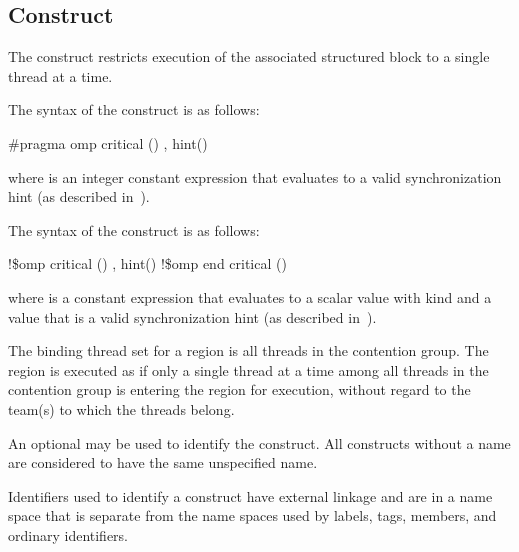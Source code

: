 \subsection{ Construct}
\label{subsec:critical Construct}
\summary
The  construct restricts execution of the associated structured block to a 
single thread at a time.

\syntax
\begin{ccppspecific}
The syntax of the  construct is as follows:

\begin{boxedcode}
  \#pragma omp critical \plc{[}() \plc{[[},\plc{]} hint()\plc{] ] new-line}
\end{boxedcode}

where  is an integer constant expression that
evaluates to a valid synchronization hint (as described in~).
\end{ccppspecific}

\begin{fortranspecific}
The syntax of the  construct is as follows:

\begin{boxedcode}
!\$omp critical \plc{[}()  \plc{[[},\plc{]} hint()\plc{] ]}
!\$omp end critical \plc{[}()\plc{]}  
\end{boxedcode}

where  is a constant expression that evaluates to
a scalar value with kind  and  a value
that is a valid synchronization hint (as described 
in~).
\end{fortranspecific}

\binding
The binding thread set for a  region is all threads in the contention group. 
The region is executed as if only a single thread at a time among all threads in the 
contention group is entering the region for execution, without regard to the team(s) to which the threads belong. 

\descr
An optional  may be used to identify the  construct. All  
constructs without a name are considered to have the same unspecified name. 

\begin{ccppspecific}
Identifiers used to identify a  construct have external linkage and are in a 
name space that is separate from the name spaces used by labels, tags, members, and 
ordinary identifiers.
\end{ccppspecific}

